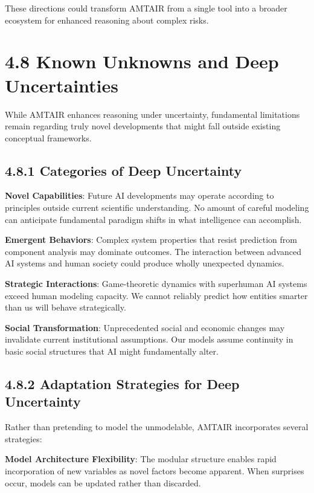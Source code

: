 \documentclass[
  11pt,
  letterpaper,
]{book}
\begin{document}
These directions could transform AMTAIR from a single tool into a
broader ecosystem for enhanced reasoning about complex risks.

\section{4.8 Known Unknowns and Deep
Uncertainties}\label{sec-deep-uncertainties}

While AMTAIR enhances reasoning under uncertainty, fundamental
limitations remain regarding truly novel developments that might fall
outside existing conceptual frameworks.

\subsection{4.8.1 Categories of Deep
Uncertainty}\label{sec-uncertainty-categories}

\textbf{Novel Capabilities}: Future AI developments may operate
according to principles outside current scientific understanding. No
amount of careful modeling can anticipate fundamental paradigm shifts in
what intelligence can accomplish.

\textbf{Emergent Behaviors}: Complex system properties that resist
prediction from component analysis may dominate outcomes. The
interaction between advanced AI systems and human society could produce
wholly unexpected dynamics.

\textbf{Strategic Interactions}: Game-theoretic dynamics with superhuman
AI systems exceed human modeling capacity. We cannot reliably predict
how entities smarter than us will behave strategically.

\textbf{Social Transformation}: Unprecedented social and economic
changes may invalidate current institutional assumptions. Our models
assume continuity in basic social structures that AI might fundamentally
alter.

\subsection{4.8.2 Adaptation Strategies for Deep
Uncertainty}\label{sec-adaptation-strategies}

Rather than pretending to model the unmodelable, AMTAIR incorporates
several strategies:

\textbf{Model Architecture Flexibility}: The modular structure enables
rapid incorporation of new variables as novel factors become apparent.
When surprises occur, models can be updated rather than discarded.
\end{document}
